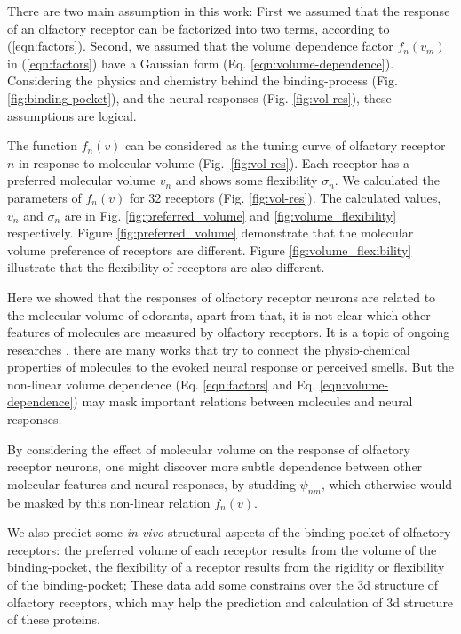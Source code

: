 \documentclass[11pt]{paper} %
\newcommand{\numberofreceptors}{32 }
\begin{document}
There are two main assumption in this work: 
First we assumed that the response of an olfactory receptor can be factorized into two terms, 
according to (\ref{eqn:factors}).
Second, we assumed that the volume dependence factor $f_n(v_m)$ in (\ref{eqn:factors}) 
have a Gaussian form (Eq. \ref{eqn:volume-dependence}).
Considering the physics and chemistry behind the binding-process (Fig. \ref{fig:binding-pocket}), 
and the neural responses (Fig. \ref{fig:vol-res}), 
these assumptions are logical. 


The function $f_n(v)$ can be considered as the tuning curve of olfactory receptor $n$ in response to molecular volume (Fig.~\ref{fig:vol-res}). 
Each receptor has a preferred molecular volume $v_n$ and shows some flexibility $\sigma_n$. 
We calculated the parameters of $f_n(v)$ for \numberofreceptors receptors (Fig. \ref{fig:vol-res}). 
The calculated values, $v_n$ and $\sigma_n$ are in Fig. \ref{fig:preferred_volume} and \ref{fig:volume_flexibility} respectively.
Figure \ref{fig:preferred_volume} demonstrate that the molecular volume preference of receptors are different. 
Figure \ref{fig:volume_flexibility} illustrate that the flexibility of receptors are also different.

Here we showed that the responses of olfactory receptor neurons are related to the molecular volume of odorants, 
apart from that, it is not clear which other features of molecules are measured by olfactory receptors. 
It is a topic of ongoing researches , 
there are many works that try to connect the physio-chemical properties of molecules to the evoked neural response or perceived smells.
But the non-linear volume dependence (Eq. \ref{eqn:factors} and Eq. \ref{eqn:volume-dependence})  
may mask important relations between molecules and neural responses.

By considering the effect of molecular volume on the response of olfactory receptor neurons, 
one might discover more subtle dependence between other molecular features and neural responses, by studding $\psi_{nm}$, 
which otherwise would be masked by this non-linear relation $f_n(v)$.

We also predict some {\it in-vivo} structural aspects of  the binding-pocket of olfactory receptors:
the preferred volume of each receptor results from the volume of the binding-pocket,
the flexibility of a receptor results from the rigidity or flexibility of the binding-pocket; 
These data add some constrains over the 3d structure of olfactory receptors, 
which may help the prediction and calculation of 3d structure of these proteins. 
\end{document}
